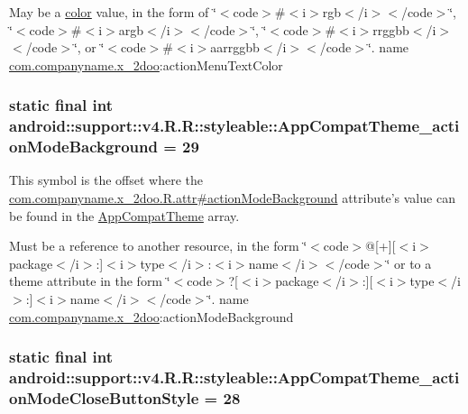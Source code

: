 May be a \hyperlink{classandroid_1_1support_1_1v4_1_1_r_1_1color}{color} value, in the form of \char`\"{}$<$code$>$\#$<$i$>$rgb$<$/i$>$$<$/code$>$\char`\"{}, \char`\"{}$<$code$>$\#$<$i$>$argb$<$/i$>$$<$/code$>$\char`\"{}, \char`\"{}$<$code$>$\#$<$i$>$rrggbb$<$/i$>$$<$/code$>$\char`\"{}, or \char`\"{}$<$code$>$\#$<$i$>$aarrggbb$<$/i$>$$<$/code$>$\char`\"{}.  name \hyperlink{namespacecom_1_1companyname_1_1x__2doo}{com.companyname.x\_\-2doo}:actionMenuTextColor \hypertarget{classandroid_1_1support_1_1v4_1_1_r_1_1styleable_f70d7a35bb0b3c72eebdf5c561070a1d}{
\subsubsection[{AppCompatTheme\_\-actionModeBackground}]{\setlength{\rightskip}{0pt plus 5cm}static final int android::support::v4.R.R::styleable::AppCompatTheme\_\-actionModeBackground = 29}}
\label{classandroid_1_1support_1_1v4_1_1_r_1_1styleable_f70d7a35bb0b3c72eebdf5c561070a1d}


This symbol is the offset where the \hyperlink{classcom_1_1companyname_1_1x__2doo_1_1_r_1_1attr_273e7a6b78866cbc1406f0ca5f6bf928}{com.companyname.x\_\-2doo.R.attr\#actionModeBackground} attribute's value can be found in the \hyperlink{classandroid_1_1support_1_1v4_1_1_r_1_1styleable_0873e92ba21076bb5a4aeadeb7f5779f}{AppCompatTheme} array.

Must be a reference to another resource, in the form \char`\"{}$<$code$>$@\mbox{[}+\mbox{]}\mbox{[}$<$i$>$package$<$/i$>$:\mbox{]}$<$i$>$type$<$/i$>$:$<$i$>$name$<$/i$>$$<$/code$>$\char`\"{} or to a theme attribute in the form \char`\"{}$<$code$>$?\mbox{[}$<$i$>$package$<$/i$>$:\mbox{]}\mbox{[}$<$i$>$type$<$/i$>$:\mbox{]}$<$i$>$name$<$/i$>$$<$/code$>$\char`\"{}.  name \hyperlink{namespacecom_1_1companyname_1_1x__2doo}{com.companyname.x\_\-2doo}:actionModeBackground \hypertarget{classandroid_1_1support_1_1v4_1_1_r_1_1styleable_cdb6ed50e0449f44c75352a5178b4674}{
\subsubsection[{AppCompatTheme\_\-actionModeCloseButtonStyle}]{\setlength{\rightskip}{0pt plus 5cm}static final int android::support::v4.R.R::styleable::AppCompatTheme\_\-actionModeCloseButtonStyle = 28}}
\label{classandroid_1_1support_1_1v4_1_1_r_1_1styleable_cdb6ed50e0449f44c75352a5178b4674}


